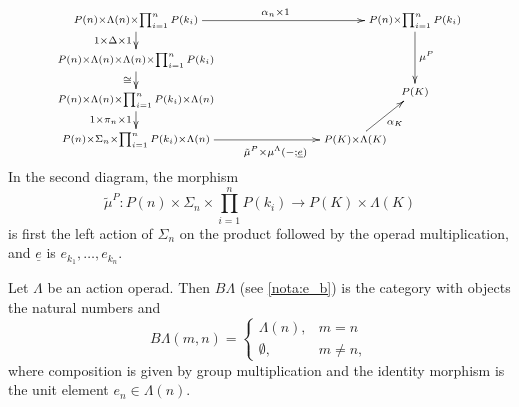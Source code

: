   \[
    \xy
      (0,0)*+{\scriptstyle P(n) \times \Lambda(n) \times \prod_{i=1}^n P(k_i) } ="00";
      (0,-10)*+{\scriptstyle P(n) \times \Lambda(n) \times \Lambda(n) \times \prod_{i=1}^n P(k_i) } ="01";
      (0,-20)*+{\scriptstyle P(n) \times \Lambda(n) \times \prod_{i=1}^n P(k_i) \times \Lambda(n) } ="02";
      (0,-30)*+{\scriptstyle P(n) \times \Sigma_{n} \times \prod_{i=1}^n P(k_i) \times \Lambda(n) } ="03";
      (55,-30)*+{\scriptstyle P(K) \times \Lambda(K) } ="13";
      (70,0)*+{\scriptstyle P(n) \times \prod_{i=1}^n P(k_i) } ="20";
      (70,-18)*+{\scriptstyle P(K) } ="21";
      {\ar_{1 \times \Delta \times 1} "00" ; "01"};
      {\ar_{\cong} "01" ; "02"};
      {\ar_{1 \times \pi_{n} \times 1} "02" ; "03"};
      {\ar^{} "03" ; "13"};
      (35,-33)*{\scriptstyle \tilde{\mu}^P \times \mu^\Lambda(-;\underline{e})};
      {\ar_{\alpha_{K}} "13" ; "21"};
      {\ar^{\alpha_{n} \times 1} "00" ; "20"};
      {\ar^{\mu^P} "20" ; "21"};
    \endxy
  \]
In the second diagram, the morphism
    \[
        \tilde{\mu}^P \colon P(n) \times \Sigma_n \times \prod_{i=1}^n P(k_i) \rightarrow P(K) \times \Lambda(K)
    \]
is first the left action of $\Sigma_n$ on the product followed by the operad multiplication, and $\underline{e}$ is $e_{k_{1}}, \ldots, e_{k_{n}}$.

\begin{Defi}\label{Defi:actop_to_cat}
Let $\Lambda$ be an action operad. Then $B\Lambda$ (see \cref{nota:e_b}) is the category with objects the natural numbers and
  \[
    B\Lambda(m,n) = \left\{ \begin{array}{lc}
    \Lambda(n), & m = n \\
    \emptyset, & m \neq n,
    \end{array} \right.
  \]
where composition is given by group multiplication and the identity morphism is the unit element $e_n \in \Lambda(n)$.
\end{Defi}

